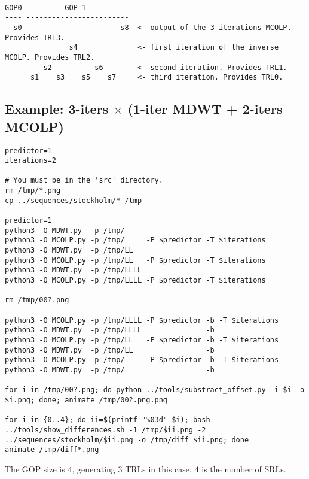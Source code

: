 \begin{verbatim}

GOP0          GOP 1
---- ------------------------
  s0                       s8  <- output of the 3-iterations MCOLP. Provides TRL3.
               s4              <- first iteration of the inverse MCOLP. Provides TRL2.
         s2          s6        <- second iteration. Provides TRL1.
      s1    s3    s5    s7     <- third iteration. Provides TRL0.

\end{verbatim}

\subsection*{Example: 3-iters $\times$ (1-iter MDWT + 2-iters MCOLP)}

\begin{verbatim}
predictor=1
iterations=2

# You must be in the 'src' directory.
rm /tmp/*.png
cp ../sequences/stockholm/* /tmp

predictor=1
python3 -O MDWT.py  -p /tmp/
python3 -O MCOLP.py -p /tmp/     -P $predictor -T $iterations
python3 -O MDWT.py  -p /tmp/LL
python3 -O MCOLP.py -p /tmp/LL   -P $predictor -T $iterations
python3 -O MDWT.py  -p /tmp/LLLL
python3 -O MCOLP.py -p /tmp/LLLL -P $predictor -T $iterations

rm /tmp/00?.png

python3 -O MCOLP.py -p /tmp/LLLL -P $predictor -b -T $iterations
python3 -O MDWT.py  -p /tmp/LLLL               -b
python3 -O MCOLP.py -p /tmp/LL   -P $predictor -b -T $iterations
python3 -O MDWT.py  -p /tmp/LL                 -b
python3 -O MCOLP.py -p /tmp/     -P $predictor -b -T $iterations
python3 -O MDWT.py  -p /tmp/                   -b

for i in /tmp/00?.png; do python ../tools/substract_offset.py -i $i -o $i.png; done; animate /tmp/00?.png.png

for i in {0..4}; do ii=$(printf "%03d" $i); bash ../tools/show_differences.sh -1 /tmp/$ii.png -2 ../sequences/stockholm/$ii.png -o /tmp/diff_$ii.png; done
animate /tmp/diff*.png
\end{verbatim}

The GOP size is $4$, generating $3$ TRLs in this case. $4$ is the number of
SRLs.

